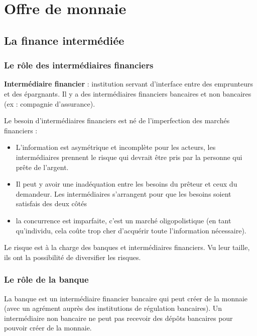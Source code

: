 \chapter{Offre de monnaie}

\section{La finance intermédiée}

	\subsection{Le rôle des intermédiaires financiers}
	
	\textbf{Intermédiaire financier} : institution servant d'interface entre des emprunteurs et des épargnants. Il y a des intermédiaires financiers bancaires et non bancaires (ex : compagnie d'assurance).
	
	Le besoin d'intermédiaires financiers est né de l'imperfection des marchés financiers :
	
	\begin{itemize}
		\item L'information est asymétrique et incomplète pour les acteurs, les intermédiaires prennent le risque qui devrait être pris par la personne qui prête de l'argent.
	
		\item Il peut y avoir une inadéquation entre les besoins du prêteur et ceux du demandeur. Les intermédiaires s'arrangent pour que les besoins soient satisfais des deux côtés
		
		\item la concurrence est imparfaite, c'est un marché oligopolistique (en tant qu'individu, cela coûte trop cher d'acquérir toute l'information nécessaire).
\end{itemize}
	Le risque est à la charge des banques et intermédiaires financiers. Vu leur taille, ils ont la possibilité de diversifier les risques.
	
	
	\subsection{Le rôle de la banque}
	
	La banque est un intermédiaire financier bancaire qui peut créer de la monnaie (avec un agrément auprès des institutions de régulation bancaires). Un intermédiaire non bancaire ne peut pas recevoir des dépôts bancaires pour pouvoir créer de la monnaie.
	
